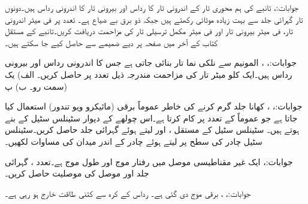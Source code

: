 جوابات:، 
تانبے کی ہم محوری تار کے اندرونی تار کا رداس  اور  بیرونی تار کا اندرونی رداس  ہیں۔دونوں تار گہرائی جلد  سے بہت زیادہ موٹائی رکھتے ہیں جبکہ ذو برق بے ضیاع ہے۔ تعدد پر فی میٹر اندرونی تار، فی میٹر بیرونی تار اور فی میٹر مکمل ترسیلی تار کی مزاحمت دریافت کریں۔تانبے کے مستقل کتاب کے آخر میں صفحہ  پر دیے ضمیمے سے حاصل کیے جا سکتے ہیں۔

جوابات:، ، 
المونیم  سے نلکی نما تار بنائی جاتی ہے جس کا اندرونی رداس  اور بیرونی رداس  ہیں۔ایک کلو میٹر تار کی مزاحمت مندرجہ ذیل تعدد پر حاصل کریں۔ الف) یک سمت رو۔ ب) پ) 

جوابات:، ، 
کھانا جلد گرم کرنے کی خاطر عموماً برقی  (مائیکرو ویو تندور)  استعمال کیا جاتا ہے جو عموماً  کے تعدد پر کام کرتا ہے۔اس چولھے کے دیوار سٹینلس سٹیل کے بنے ہوتے ہیں۔ سٹینلس سٹیل کے مستقل ،  اور  لیتے ہوئے گہرائی جلد  حاصل کریں۔سٹینلس سٹیل چادر کی سطح پر
  لیتے ہوئے چادر کے اندر میدان کی مساوات لکھیں۔

جوابات:،    
ایک غیر مقناطیسی موصل میں رفتار موج  اور طول موج  ہے۔تعدد ، گہرائی جلد   اور موصل کی موصلیت  حاصل کریں۔

جوابات:، ،   
برقی موج  دی گئی ہے۔ رداس  کے کرہ سے کتنی طاقت خارج ہو رہی ہے۔

